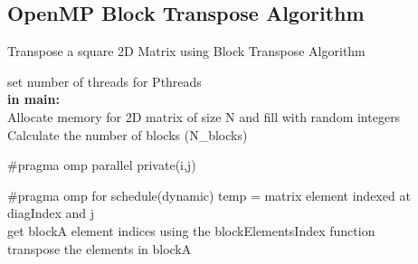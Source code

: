 \documentclass[10pt, onecolumn]{article}
\begin{document}
\subsection{OpenMP Block Transpose Algorithm}
%
\begin{algorithm}[H]
   \label{Alg:OpenMPBlockAlgorithm2}
    \caption{Transpose a square 2D Matrix using Block Transpose Algorithm}
    set number of threads for Pthreads\\
    
    \textbf{in main:} \\
    Allocate memory for 2D matrix of size N and fill with random integers \\
    Calculate the number of blocks (N\_blocks)\\
    {   
       \#pragma omp parallel private(i,j)
        {
        
            \#pragma omp for schedule(dynamic)
            {
                {
                    temp = matrix element indexed at diagIndex and j \\
                    get blockA element indices using the blockElementsIndex function\\
                    transpose the elements in blockA\\
            }
            }

        }
    }
\end{algorithm}
%
\end{document}
